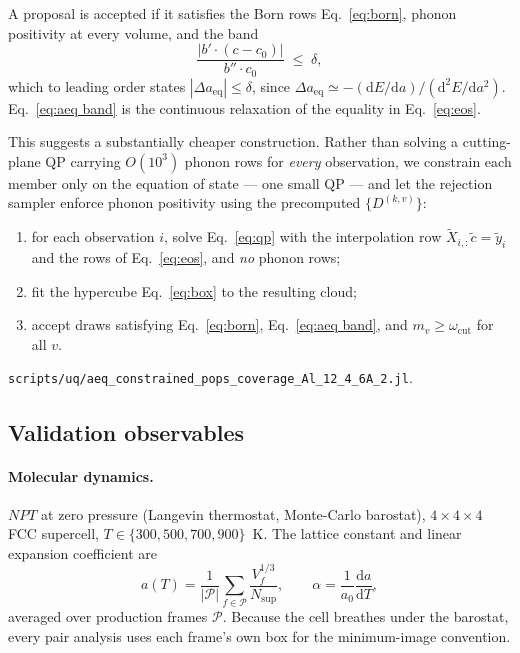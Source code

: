 \documentclass{article}
\newcommand{\code}[1]{\texttt{\small #1}}
\begin{document}
A proposal is accepted if it satisfies the Born rows Eq.~\eqref{eq:born}, phonon
positivity at every volume, and the band
\begin{equation}
  \frac{\bigl|b'\cdot(c-c_0)\bigr|}{b''\cdot c_0} \;\le\; \delta ,
  \label{eq:aeq band}
\end{equation}
which to leading order states $|\Delta a_{\mathrm{eq}}| \le \delta$, since
$\Delta a_{\mathrm{eq}} \simeq -(\mathrm{d}E/\mathrm{d}a)/(\mathrm{d}^{2}E/\mathrm{d}a^{2})$.
Eq.~\eqref{eq:aeq band} is the continuous relaxation of the equality in
Eq.~\eqref{eq:eos}.

This suggests a substantially cheaper construction. Rather than solving a
cutting-plane QP carrying $O(10^{3})$ phonon rows for \emph{every} observation,
we constrain each member only on the equation of state --- one small QP --- and
let the rejection sampler enforce phonon positivity using the precomputed
$\{D^{(k,v)}\}$:
\begin{enumerate}
  \item for each observation $i$, solve Eq.~\eqref{eq:qp} with the interpolation row $\tilde X_{i,:}\tilde c = \tilde y_i$ and the rows of Eq.~\eqref{eq:eos}, and \emph{no} phonon rows;
  \item fit the hypercube Eq.~\eqref{eq:box} to the resulting cloud;
  \item accept draws satisfying Eq.~\eqref{eq:born}, Eq.~\eqref{eq:aeq band}, and $m_v \ge \omega_{\mathrm{cut}}$ for all $v$.
\end{enumerate}
\code{scripts/uq/aeq\_constrained\_pops\_coverage\_Al\_12\_4\_6A\_2.jl}.

\subsection{Validation observables}

\paragraph{Molecular dynamics.} $NPT$ at zero pressure (Langevin thermostat,
Monte-Carlo barostat), $4\times4\times4$ FCC supercell,
$T\in\{300,500,700,900\}$~K. The lattice constant and linear expansion
coefficient are
\begin{equation}
  a(T) = \frac{1}{|\mathcal P|}\sum_{f\in\mathcal P}\frac{V_f^{1/3}}{N_{\mathrm{sup}}},
  \qquad
  \alpha = \frac{1}{a_0}\frac{\mathrm{d}a}{\mathrm{d}T},
  \label{eq:alpha}
\end{equation}
averaged over production frames $\mathcal P$. Because the cell breathes under the
barostat, every pair analysis uses each frame's own box for the minimum-image
convention.
\end{document}
